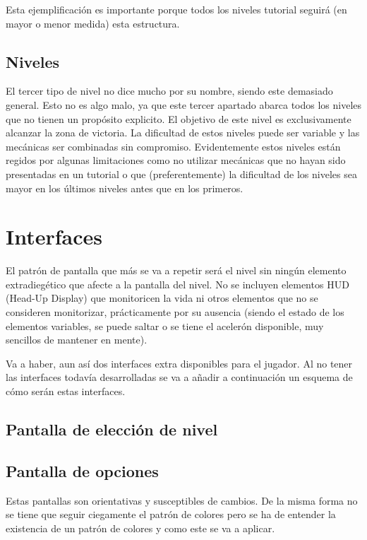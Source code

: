 Esta ejemplificación es importante porque todos los niveles tutorial seguirá (en mayor o menor medida) esta estructura.

\subsection{Niveles}
El tercer tipo de nivel no dice mucho por su nombre, siendo este demasiado general. Esto no es algo malo, ya que este tercer apartado abarca todos los niveles que no tienen un propósito explicito. El objetivo de este nivel es exclusivamente alcanzar la zona de victoria. La dificultad de estos niveles puede ser variable y las mecánicas ser combinadas sin compromiso. 
Evidentemente estos niveles están regidos por algunas limitaciones como no utilizar mecánicas que no hayan sido presentadas en un tutorial o que (preferentemente) la dificultad de los niveles sea mayor en los últimos niveles antes que en los primeros.

\section{Interfaces}
El patrón de pantalla que más se va a repetir será el nivel sin ningún elemento extradiegético que afecte a la pantalla del nivel. No se incluyen elementos HUD (Head-Up Display) que monitoricen la vida ni otros elementos que no se consideren monitorizar, prácticamente por su ausencia (siendo el estado de los elementos variables, se puede saltar o se tiene el acelerón disponible, muy sencillos de mantener en mente).

Va a haber, aun así dos interfaces extra disponibles para el jugador. Al no tener las interfaces todavía desarrolladas se va a añadir a continuación un esquema de cómo serán estas interfaces.

\subsection{Pantalla de elección de nivel}

\subsection{Pantalla de opciones}

Estas pantallas son orientativas y susceptibles de cambios. De la misma forma no se tiene que seguir ciegamente el patrón de colores pero se ha de entender la existencia de un patrón de colores y como este se va a aplicar.

